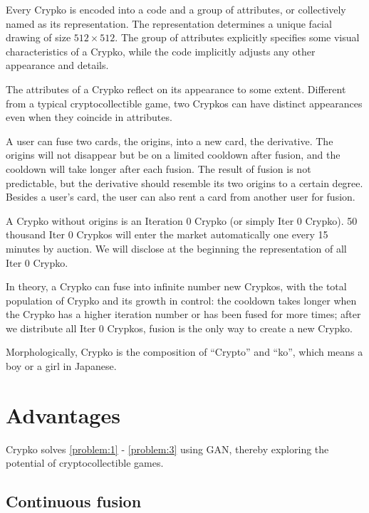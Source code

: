 \documentclass[a4paper]{article}
\begin{document}
Every Crypko is encoded into a code and a group of attributes, or collectively named as its representation. The representation determines a unique facial drawing of size $512 \times 512$. The group of attributes explicitly specifies some visual characteristics of a Crypko, while the code implicitly adjusts any other appearance and details.

The attributes of a Crypko reflect on its appearance to some extent. Different from a typical cryptocollectible game, two Crypkos can have distinct appearances even when they coincide in attributes.

A user can fuse two cards, the origins, into a new card, the derivative. The origins will not disappear but be on a limited cooldown after fusion, and the cooldown will take longer after each fusion. The result of fusion is not predictable, but the derivative should resemble its two origins to a certain degree. Besides a user's card, the user can also rent a card from another user for fusion.

A Crypko without origins is an Iteration 0 Crypko (or simply Iter 0 Crypko). 50 thousand Iter 0 Crypkos will enter the market automatically one every 15 minutes by auction. We will disclose at the beginning the representation of all Iter 0 Crypko.

In theory, a Crypko can fuse into infinite number new Crypkos, with the total population of Crypko and its growth in control: the cooldown takes longer when the Crypko has a higher iteration number or has been fused for more times; after we distribute all Iter 0 Crypkos, fusion is the only way to create a new Crypko.

Morphologically, Crypko is the composition of ``Crypto'' and ``ko'', which means a boy or a girl in Japanese.

\section{Advantages}

Crypko solves \ref{problem:1} - \ref{problem:3} using GAN, thereby exploring the potential of cryptocollectible games.

\subsection{Continuous fusion}
\end{document}
